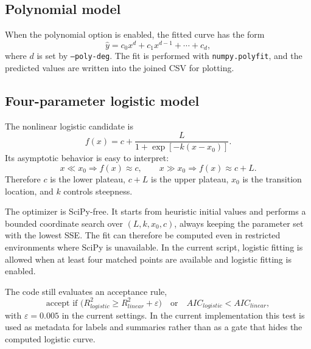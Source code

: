 \documentclass[11pt]{article}
\begin{document}
\subsection{Polynomial model}
When the polynomial option is enabled, the fitted curve has the form
\[
\hat y = c_0x^d + c_1x^{d-1} + \cdots + c_d,
\]
where $d$ is set by \texttt{--poly-deg}. The fit is performed with \texttt{numpy.polyfit}, and the predicted values are written into the joined CSV for plotting.

\subsection{Four-parameter logistic model}
The nonlinear logistic candidate is
\[
f(x) = c + \frac{L}{1 + \exp[-k(x-x_0)]}.
\]
Its asymptotic behavior is easy to interpret:
\[
x \ll x_0 \Rightarrow f(x) \approx c,
\qquad
x \gg x_0 \Rightarrow f(x) \approx c + L.
\]
Therefore $c$ is the lower plateau, $c+L$ is the upper plateau, $x_0$ is the transition location, and $k$ controls steepness.

The optimizer is SciPy-free. It starts from heuristic initial values and performs a bounded coordinate search over $(L,k,x_0,c)$, always keeping the parameter set with the lowest SSE. The fit can therefore be computed even in restricted environments where SciPy is unavailable. In the current script, logistic fitting is allowed when at least four matched points are available and logistic fitting is enabled.

The code still evaluates an acceptance rule,
\[
\text{accept if } \bigl(R^2_{logistic} \ge R^2_{linear} + \varepsilon\bigr)
\quad \text{or} \quad
AIC_{logistic} < AIC_{linear},
\]
with $\varepsilon = 0.005$ in the current settings. In the current implementation this test is used as metadata for labels and summaries rather than as a gate that hides the computed logistic curve.
\end{document}
